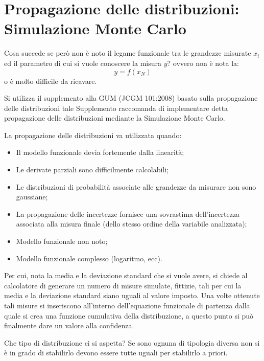 \documentclass[a4paper, 15pt]{article}
\begin{document}
\section{Propagazione delle distribuzioni: Simulazione Monte Carlo}  		 
\begin{adjustwidth}{2in}{}  
  		 Cosa succede se però non è noto il legame funzionale tra le grandezze misurate
  		 $x_i$ ed il parametro di cui si vuole conoscere la misura $y$?
  		 ovvero non è nota la:
  		 \[y = f(x_N)\]
  		 o è molto difficile da ricavare.
  		 
  		 Si utilizza il supplemento alla GUM (JCGM 101:2008) basato sulla
  		 propagazione delle distribuzioni tale Supplemento raccomanda di implementare detta propagazione delle
  		 distribuzioni mediante la Simulazione Monte Carlo. \newline 
  		 
  		 La propagazione delle distribuzioni va utilizzata quando:
  		 \begin{itemize}
  		 	\item Il modello funzionale devia fortemente dalla linearità;
  		 	\item Le derivate parziali sono difficilmente calcolabili;
  		 	\item Le distribuzioni di probabilità associate alle grandezze da misurare non sono
  		 	gaussiane;
  		 	\item La propagazione delle incertezze fornisce una sovrastima dell’incertezza associata
  		 	alla misura finale (dello stesso ordine della variabile analizzata);
  		 	\item Modello funzionale non noto; 
  		 	\item Modello funzionale complesso (logaritmo, ecc).
  		 \end{itemize} 
  	 
  	 		Per cui, nota la media e la deviazione standard che si vuole avere, si chiede al calcolatore di generare un numero di misure simulate, fittizie, tali per cui la media e la deviazione standard siano uguali al valore imposto. Una volte ottenute tali misure si inseriscono all'interno dell'equazione funzionale di partenza dalla quale si crea una funzione cumulativa della distribuzione, a questo punto si può finalmente dare un valore alla confidenza. \newline 
  	 		
  	 		Che tipo di distribuzione ci si aspetta? Se sono ognuna di tipologia diversa non si è in grado di stabilirlo devono essere tutte uguali per stabilirlo a priori. \newline
  	 		

\end{adjustwidth}
\end{document}
